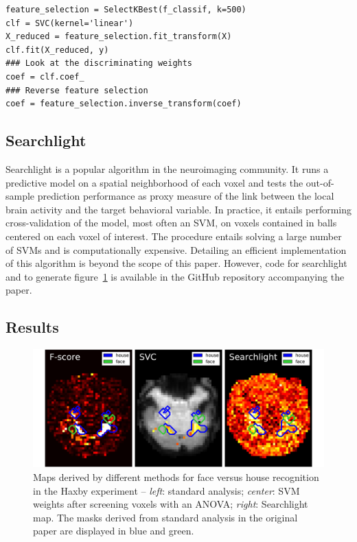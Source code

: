 \documentclass{frontiersSCNS} %
\begin{document}
\begin{lstlisting}
feature_selection = SelectKBest(f_classif, k=500)
clf = SVC(kernel='linear')
X_reduced = feature_selection.fit_transform(X)
clf.fit(X_reduced, y)
### Look at the discriminating weights
coef = clf.coef_
### Reverse feature selection
coef = feature_selection.inverse_transform(coef)
\end{lstlisting}

\subsection{Searchlight}
\label{searchlight}

Searchlight \citep{kriegeskorte2006} is a popular algorithm in the
neuroimaging community. It runs a predictive model on a spatial
neighborhood of each voxel and tests the out-of-sample prediction
performance as proxy measure of the link between the local brain activity
and the target behavioral variable. In practice, it entails performing
cross-validation of the model, most often an SVM, on voxels contained in
balls centered on each voxel of interest. The procedure entails 
solving a large number of SVMs and is computationally expensive.
Detailing an efficient implementation of this algorithm is beyond the
scope of this paper. However, code for searchlight and to generate
figure~\ref{fig:haxby}
is available in the GitHub repository accompanying the paper.

\subsection{Results}

\begin{figure}[hbtp]
  \begin{center}
  \includegraphics[width=\linewidth]{haxby}
  \end{center}
\caption{Maps derived by different methods for face versus house
recognition in the Haxby experiment -- \emph{left}: standard analysis;
\emph{center}: SVM weights after screening voxels with an ANOVA; \emph{right}:
Searchlight map. The masks derived from standard analysis in the original
paper \citep{haxby2001} are displayed in blue and green.}
\label{fig:haxby}
\end{figure}
\end{document}
